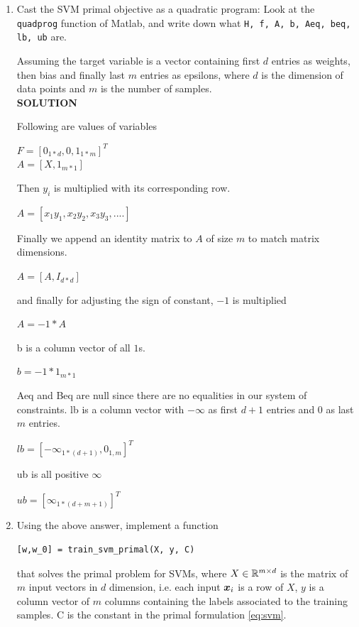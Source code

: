 \documentclass{article}
\begin{document}
\begin{enumerate}
\item Cast the SVM primal objective as a quadratic program: Look at the \texttt{quadprog} function of Matlab, and write down what \texttt{H, f, A, b, Aeq, beq, lb, ub} are. 

Assuming the target variable is a vector containing first $d$ entries as weights, then bias and finally last $m$ entries as epsilons, where $d$ is the dimension of data points and $m$ is the number of samples. \\

\textbf{SOLUTION}
\begin{mdframed}[backgroundcolor=lightgray]
Following are values of variables \\
\begin{center}
$F = [0_{1 * d}, 0, 1_{1 * m}]^T$ \\

$A = [X, 1_{m * 1}]$
\end{center}

Then $y_i$ is multiplied with its corresponding row.
\begin{center}
$A = [x_1 y_1, x_2 y_2, x_3 y_3, ....]$
\end{center}

Finally we append an identity matrix to $A$ of size $m$ to match matrix dimensions.
\begin{center}
$A = [A, I_{d * d}]$
\end{center}

and finally for adjusting the sign of constant, $-1$ is multiplied
\begin{center}
$A = -1 * A$
\end{center}
b is a column vector of all $1$s.
\begin{center}
$b = -1 * 1_{m * 1}$
\end{center}
Aeq and Beq are null since there are no equalities in our system of constraints. lb is a column vector with $-\infty$ as first $d + 1$ entries and $0$ as last $m$ entries.
\begin{center}
$lb = [-\infty_{1 * (d+1)}, 0_{1, m}]^T$
\end{center}

ub is all positive $\infty$
\begin{center}
$ub = [\infty_{1 * (d+m+1)}]^T$
\end{center}
\end{mdframed}

\item Using the above answer, implement a function
\begin{verbatim}
[w,w_0] = train_svm_primal(X, y, C)
\end{verbatim}
that solves the primal problem for SVMs, where $X \in \mathbb{R}^{m \times d}$ is the matrix of $m$ input vectors in $d$ dimension, i.e. each input $\boldsymbol{x}_i$ is a row of $X$, $y$ is a column vector of $m$ columns containing the labels associated to the training samples.
C is the constant in the primal formulation \eqref{eq:svm}.


\end{enumerate}
\end{document}
